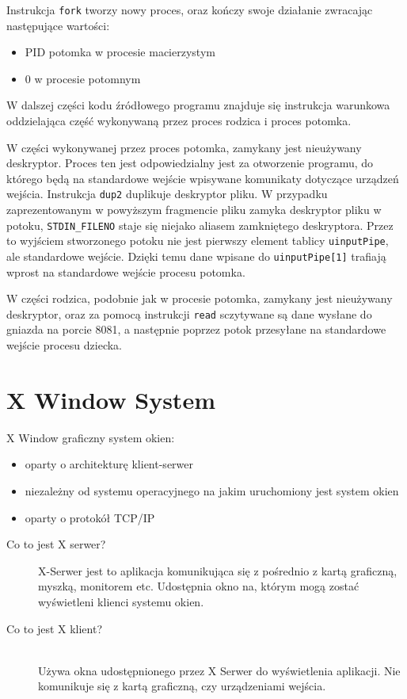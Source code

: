\begin{appendices}
Instrukcja \lstinline|fork| tworzy nowy proces, oraz kończy swoje działanie zwracając następujące wartości:

\begin{itemize}
	\item PID potomka w procesie macierzystym
	\item 0 w procesie potomnym
\end{itemize}

W dalszej części kodu źródłowego programu znajduje się instrukcja warunkowa oddzielająca część wykonywaną przez proces rodzica i proces potomka. 

W części wykonywanej przez proces potomka, zamykany jest nieużywany deskryptor. Proces ten jest odpowiedzialny jest za otworzenie programu, do którego będą na standardowe wejście wpisywane komunikaty dotyczące urządzeń wejścia. Instrukcja \lstinline{dup2} duplikuje deskryptor pliku. W przypadku zaprezentowanym w powyższym fragmencie pliku zamyka deskryptor pliku w potoku, \lstinline{STDIN_FILENO} staje się niejako aliasem zamkniętego deskryptora. Przez to wyjściem stworzonego potoku nie jest pierwszy element tablicy \lstinline{uinputPipe}, ale standardowe wejście. Dzięki temu dane wpisane do \lstinline{uinputPipe[1]} trafiają wprost na standardowe wejście procesu potomka.

W części rodzica, podobnie jak w procesie potomka, zamykany jest nieużywany deskryptor, oraz za pomocą instrukcji \lstinline{read} sczytywane są dane wysłane do gniazda na porcie 8081, a następnie poprzez potok przesyłane na standardowe wejście procesu dziecka.

\newpage
\section{X Window System}
\label{app:X Window System}
X Window graficzny system okien:
\begin{itemize}
	\item oparty o architekturę klient-serwer
	\item niezależny od systemu operacyjnego na jakim uruchomiony jest system okien
	\item oparty o protokół TCP/IP
\end{itemize}

\begin{description}
	\item[Co to jest X serwer?] \hfill \par
		X-Serwer jest to aplikacja komunikująca się z pośrednio z kartą graficzną, myszką, monitorem etc. Udostępnia okno na, którym mogą zostać wyświetleni klienci systemu okien.
	\item[Co to jest X klient?] \hfill \\
Używa okna udostępnionego przez X Serwer do wyświetlenia aplikacji. Nie komunikuje się z kartą graficzną, czy urządzeniami wejścia.


\end{description}
\end{appendices}
